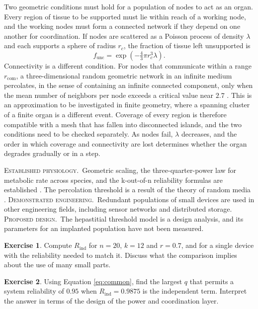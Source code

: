 \documentclass[11pt,openany]{book}
\theoremstyle{definition}
\newtheorem{exercise}{Exercise}[chapter]
\theoremstyle{remark}
\newcommand{\est}{\textsc{Established physiology.}\ }
\newcommand{\dem}{\textsc{Demonstrated engineering.}\ }
\newcommand{\pro}{\textsc{Proposed design.}\ }
\begin{document}
Two geometric conditions must hold for a population of nodes to act as an organ. Every region of tissue to be supported must lie within reach of a working node, and the working nodes must form a connected network if they depend on one another for coordination. If nodes are scattered as a Poisson process of density $\lambda$ and each supports a sphere of radius $r_c$, the fraction of tissue left unsupported is
\begin{equation}
f_{\mathrm{unc}}=\exp\!\left(-\tfrac{4}{3}\pi r_c^{3}\lambda\right).
\label{eq:coverage}
\end{equation}
Connectivity is a different condition. For nodes that communicate within a range $r_{\mathrm{com}}$, a three-dimensional random geometric network in an infinite medium percolates, in the sense of containing an infinite connected component, only when the mean number of neighbors per node exceeds a critical value near $2.7$ \cite{torquato2002}. This is an approximation to be investigated in finite geometry, where a spanning cluster of a finite organ is a different event. Coverage of every region is therefore compatible with a mesh that has fallen into disconnected islands, and the two conditions need to be checked separately. As nodes fail, $\lambda$ decreases, and the order in which coverage and connectivity are lost determines whether the organ degrades gradually or in a step.

\begin{evidence}
\est Geometric scaling, the three-quarter-power law for metabolic rate across species, and the k-out-of-n reliability formulas are established \cite{kleiber1932,west1997,schmidtnielsen1984,rausand2004}. The percolation threshold is a result of the theory of random media \cite{torquato2002}. \dem Redundant populations of small devices are used in other engineering fields, including sensor networks and distributed storage. \pro The hepastitial threshold model is a design analysis, and its parameters for an implanted population have not been measured.
\end{evidence}

\begin{exercise}
Compute $R_{\mathrm{ind}}$ for $n=20$, $k=12$ and $r=0.7$, and for a single device with the reliability needed to match it. Discuss what the comparison implies about the use of many small parts.
\end{exercise}

\begin{exercise}
Using Equation \eqref{eq:common}, find the largest $q$ that permits a system reliability of $0.95$ when $R_{\mathrm{ind}}=0.9875$ is the independent term. Interpret the answer in terms of the design of the power and coordination layer.
\end{exercise}
\end{document}
